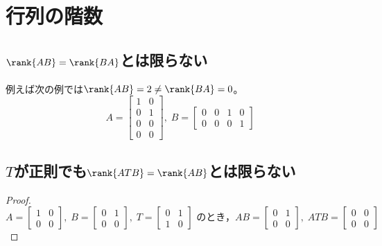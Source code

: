\chapter{行列の階数}
    \section{\texorpdfstring{$\rank{AB}=\rank{BA}$}{rank(AB)=rank(BA)}とは限らない}
        例えば次の例では$\rank{AB} = 2 \neq \rank{BA}=0$。
        \[
            A =
            \begin{bmatrix}
                1 & 0 \\
                0 & 1 \\
                0 & 0 \\
                0 & 0
            \end{bmatrix},\;
            B = \begin{bmatrix}
                0 & 0 & 1 & 0 \\
                0 & 0 & 0 & 1
            \end{bmatrix}
        \]
    \section{\texorpdfstring{$T$}{T}が正則でも\texorpdfstring{$\rank{ATB}=\rank{AB}$}{rank(ATB) = rank(AB)}とは限らない}
        \begin{proof}
            \[
                A =
                \begin{bmatrix}
                    1 & 0 \\
                    0 & 0
                \end{bmatrix},\;
                B =
                \begin{bmatrix}
                    0 & 1 \\
                    0 & 0
                \end{bmatrix},\;
                T =
                \begin{bmatrix}
                    0 & 1 \\
                    1 & 0
                \end{bmatrix}
                \text{ のとき，}
                AB =
                \begin{bmatrix}
                    0 & 1 \\
                    0 & 0
                \end{bmatrix},\;
                ATB =
                \begin{bmatrix}
                    0 & 0 \\
                    0 & 0
                \end{bmatrix}
            \]
        \end{proof}
